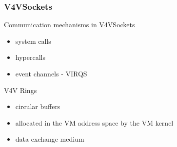 \documentclass[red,slidestop,notes,compress,mathserif]{beamer}
\begin{document}
\begin{frame}
\frametitle{V4VSockets}       
\begin{block}{Communication mechanisms in V4VSockets}
\begin{itemize}
\item system calls 
\item hypercalls
\item event channels - VIRQS
\end{itemize}
\end{block}
\begin{block}{V4V Rings}
\begin{itemize}
\item circular buffers 
\item allocated in the VM address space by the VM kernel
\item data exchange medium
\end{itemize}
\end{block}
\end{frame}
\end{document}
